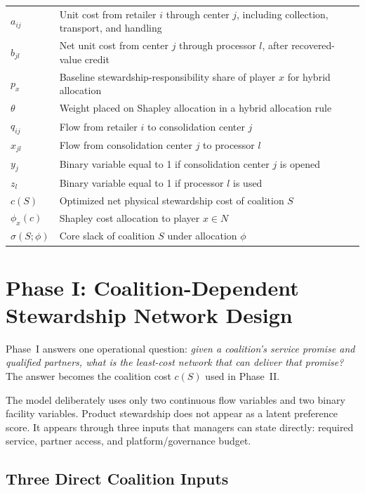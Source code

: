 \begin{table}[htbp]
{\begin{tabular}{ll}
$a_{ij}$ & Unit cost from retailer $i$ through center $j$, including collection, transport, and handling \\
$b_{jl}$ & Net unit cost from center $j$ through processor $l$, after recovered-value credit \\
$p_x$ & Baseline stewardship-responsibility share of player $x$ for hybrid allocation \\
$\theta$ & Weight placed on Shapley allocation in a hybrid allocation rule \\
\midrule
$q_{ij}$ & Flow from retailer $i$ to consolidation center $j$ \\
$x_{jl}$ & Flow from consolidation center $j$ to processor $l$ \\
$y_j$ & Binary variable equal to 1 if consolidation center $j$ is opened \\
$z_l$ & Binary variable equal to 1 if processor $l$ is used \\
$c(S)$ & Optimized net physical stewardship cost of coalition $S$ \\
$\phi_x(c)$ & Shapley cost allocation to player $x\in N$ \\
$\sigma(S;\phi)$ & Core slack of coalition $S$ under allocation $\phi$ \\
\bottomrule
\end{tabular}%
}
\end{table}

\section{Phase I: Coalition-Dependent Stewardship Network Design}
\label{sec:milp}

Phase~I answers one operational question: \emph{given a coalition's service promise and qualified partners, what is the least-cost network that can deliver that promise?} The answer becomes the coalition cost $c(S)$ used in Phase~II.

The model deliberately uses only two continuous flow variables and two binary facility variables. Product stewardship does not appear as a latent preference score. It appears through three inputs that managers can state directly: required service, partner access, and platform/governance budget.

\subsection{Three Direct Coalition Inputs}

